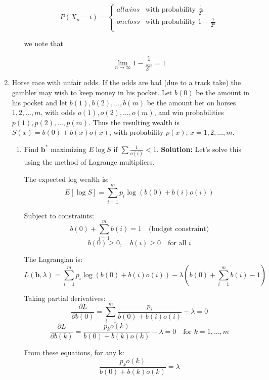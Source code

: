 \documentclass{article}
\begin{document}
\begin{enumerate}
\begin{enumerate}
        \[
            P(X_n = i) = \begin{cases}
                all wins & \text{with probability } \frac{1}{2^n} \\
                one loss & \text{with probability } 1- \frac{1}{2^n} \\
            \end{cases}
        \]

        we note that 

        \[
            \lim_{n \to \infty} 1 - \frac{1}{2^n} = 1
        \]

    \end{enumerate}

    \item Horse race with unfair odds. If the odds are bad (due to a track take) the gambler may wish to keep money in his pocket. Let $b(0)$ be the amount in his pocket and let $b(1), b(2), \ldots, b(m)$ be the amount bet on horses $1, 2, \ldots, m$, with odds $o(1), o(2), \ldots, o(m)$, and win probabilities $p(1), p(2), \ldots, p(m)$. Thus the resulting wealth is $S(x) = b(0) + b(x)o(x)$, with probability $p(x)$, $x = 1, 2, \ldots, m$.
    \begin{enumerate}
        \item Find $\mathbf{b}^*$ maximizing $E \log S$ if $\sum \frac{1}{o(i)} < 1$.
        \textbf{Solution:} Let's solve this using the method of Lagrange multipliers.

        The expected log wealth is:
        \[
            E[\log S] = \sum_{i=1}^m p_i \log(b(0) + b(i)o(i))
        \]

        Subject to constraints:
        \[
            b(0) + \sum_{i=1}^m b(i) = 1 \quad \text{(budget constraint)}
        \]
        \[
            b(0) \geq 0, \quad b(i) \geq 0 \quad \text{for all } i
        \]

        The Lagrangian is:
        \[
            L(\mathbf{b}, \lambda) = \sum_{i=1}^m p_i \log(b(0) + b(i)o(i)) - \lambda(b(0) + \sum_{i=1}^m b(i) - 1)
        \]

        Taking partial derivatives:
        \[
            \frac{\partial L}{\partial b(0)} = \sum_{i=1}^m \frac{p_i}{b(0) + b(i)o(i)} - \lambda = 0
        \]
        \[
            \frac{\partial L}{\partial b(k)} = \frac{p_k o(k)}{b(0) + b(k)o(k)} - \lambda = 0 \quad \text{for } k = 1,\ldots,m
        \]

        From these equations, for any k:
        \[
            \frac{p_k o(k)}{b(0) + b(k)o(k)} = \lambda
        \]


\end{enumerate}
\end{enumerate}
\end{document}
